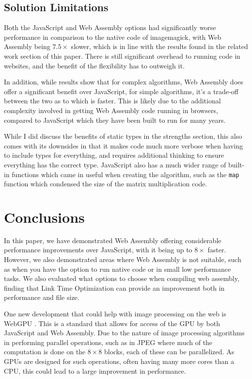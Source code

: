 \documentclass[12pt,a4paper]{article}
\begin{document}
\subsection{Solution Limitations}

Both the JavaScript and Web Assembly options had significantly worse performance in comparison to the native code of imagemagick, with Web Assembly being $7.5 \times$ slower, which is in line with the results found in the related work section of this paper. There is still significant overhead to running code in websites, and the benefit of the flexibility has to outweigh it.

In addition, while results show that for complex algorithms, Web Assembly does offer a significant benefit over JavaScript, for simple algorithms, it's a trade-off between the two as to which is faster. This is likely due to the additional complexity involved in getting Web Assembly code running in browsers, compared to JavaScript which they have been built to run for many years.

While I did discuss the benefits of static types in the strengths section, this also comes with its downsides in that it makes code much more verbose when having to include types for everything, and requires additional thinking to ensure everything has the correct type. JavaScript also has a much wider range of built-in functions which came in useful when creating the algorithm, such as the \texttt{map} function which condensed the size of the matrix multiplication code.


\section{Conclusions}

In this paper, we have demonstrated Web Assembly offering considerable performance improvements over JavaScript, with it being up to $8\times$ faster. However, we also demonstrated areas where Web Assembly is not suitable, such as when you have the option to run native code or in small low performance tasks. We also evaluated what options to choose when compiling web assembly, finding that Link Time Optimization can provide an improvement both in performance and file size.

One new development that could help with image processing on the web is WebGPU \cite{webgpu}. This is a standard that allows for access of the GPU by both JavaScript and Web Assembly. Due to the nature of image processing algorithms in performing parallel operations, such as in JPEG where much of the computation is done on the $8\times 8$ blocks, each of these can be parallelized. As GPUs are designed for such operations, often having many more cores than a CPU, this could lead to a large improvement in performance.



\newpage

\end{document}
